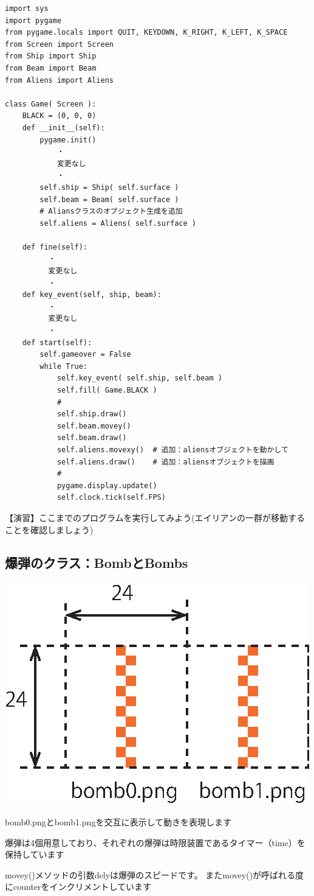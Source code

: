 \documentclass[uplatex,a4paper,11pt,oneside,openany]{jsbook}
\begin{document}
\begin{lstlisting}[caption=Gameクラス（aliensオブジェクトを追加）,label=p001-3]
import sys
import pygame
from pygame.locals import QUIT, KEYDOWN, K_RIGHT, K_LEFT, K_SPACE
from Screen import Screen
from Ship import Ship
from Beam import Beam
from Aliens import Aliens

class Game( Screen ):
    BLACK = (0, 0, 0)
    def __init__(self):
        pygame.init()
            ・
            変更なし
            ・
        self.ship = Ship( self.surface )
        self.beam = Beam( self.surface )
        # Aliansクラスのオブジェクト生成を追加
        self.aliens = Aliens( self.surface )

    def fine(self):
          ・
          変更なし
          ・
    def key_event(self, ship, beam):
          ・
          変更なし
          ・
    def start(self):
        self.gameover = False
        while True:
            self.key_event( self.ship, self.beam )
            self.fill( Game.BLACK )
            #
            self.ship.draw()
            self.beam.movey()
            self.beam.draw()
            self.aliens.movexy()  # 追加：aliensオブジェクトを動かして
            self.aliens.draw()    # 追加：aliensオブジェクトを描画
            #
            pygame.display.update()
            self.clock.tick(self.FPS)
\end{lstlisting}

【演習】ここまでのプログラムを実行してみよう(エイリアンの一群が移動することを確認しましょう)

\subsection{爆弾のクラス：BombとBombs}

\begin{center}
  \includegraphics[width=0.3\hsize]{figures/eps/bomb0.eps}
\end{center}

bomb0.pngとbomb1.pngを交互に表示して動きを表現します

爆弾は4個用意しており、それぞれの爆弾は時限装置であるタイマー（time）を保持しています

movey()メソッドの引数delyは爆弾のスピードです。
またmovey()が呼ばれる度にcounterをインクリメントしています
\end{document}
